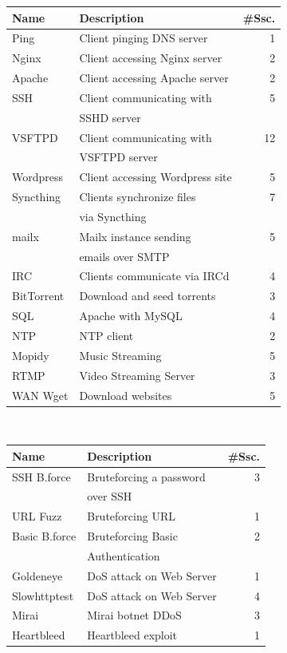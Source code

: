 \documentclass[runningheads]{llncs}
\begin{document}
\begin{table}
\scriptsize
\begin{tabular}[t]{l|l|r}
 \hline
 Name & Description & \#Ssc. \\
 \hline
 Ping & Client pinging DNS server & 1 \\
 Nginx & Client accessing Nginx server & 2\\
 Apache & Client accessing Apache server & 2\\
 SSH & Client communicating with & 5\\
 &SSHD server&\\
 VSFTPD & Client communicating with & 12\\
 &VSFTPD server&\\
 Wordpress & Client accessing Wordpress site & 5\\
 Syncthing& Clients synchronize files & 7\\
 &via Syncthing&\\
 mailx& Mailx instance sending & 5\\
 &emails over SMTP &\\
 IRC & Clients communicate via IRCd& 4\\
 BitTorrent & Download and seed torrents & 3 \\
 SQL & Apache with MySQL & 4\\
 NTP & NTP client & 2\\
 Mopidy & Music Streaming & 5\\
 RTMP & Video Streaming Server & 3\\
 WAN Wget & Download websites & 5 \\
\hline
\end{tabular}
~
\begin{tabular}[t]{l|l|r}
 \hline
 Name & Description & \#Ssc. \\
 \hline
 SSH B.force & Bruteforcing a password & 3\\
 &over SSH&\\
 URL Fuzz & Bruteforcing URL & 1\\
 Basic B.force & Bruteforcing Basic & 2\\
 &Authentication&\\
 Goldeneye & DoS attack on Web Server & 1\\
 Slowhttptest & DoS attack on Web Server & 4 \\
 Mirai & Mirai botnet DDoS & 3\\
 Heartbleed & Heartbleed exploit & 1\\

\end{tabular}
\end{table}
\end{document}
